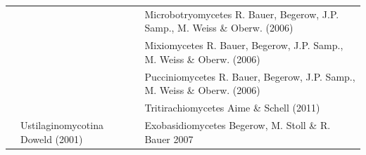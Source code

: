 \documentclass[]{book}
\begin{document}
\begin{longtable}[]{@{}lll@{}}
\begin{minipage}[t]{0.32\columnwidth}
\strut
\end{minipage} & \begin{minipage}[t]{0.28\columnwidth}\raggedright\strut
\strut
\end{minipage} & \begin{minipage}[t]{0.31\columnwidth}\raggedright\strut
Microbotryomycetes R. Bauer, Begerow, J.P. Samp., M. Weiss \& Oberw.
(2006)\strut
\end{minipage}\tabularnewline
\begin{minipage}[t]{0.32\columnwidth}\raggedright\strut
\strut
\end{minipage} & \begin{minipage}[t]{0.28\columnwidth}\raggedright\strut
\strut
\end{minipage} & \begin{minipage}[t]{0.31\columnwidth}\raggedright\strut
Mixiomycetes R. Bauer, Begerow, J.P. Samp., M. Weiss \& Oberw.
(2006)\strut
\end{minipage}\tabularnewline
\begin{minipage}[t]{0.32\columnwidth}\raggedright\strut
\strut
\end{minipage} & \begin{minipage}[t]{0.28\columnwidth}\raggedright\strut
\strut
\end{minipage} & \begin{minipage}[t]{0.31\columnwidth}\raggedright\strut
Pucciniomycetes R. Bauer, Begerow, J.P. Samp., M. Weiss \& Oberw.
(2006)\strut
\end{minipage}\tabularnewline
\begin{minipage}[t]{0.32\columnwidth}\raggedright\strut
\strut
\end{minipage} & \begin{minipage}[t]{0.28\columnwidth}\raggedright\strut
\strut
\end{minipage} & \begin{minipage}[t]{0.31\columnwidth}\raggedright\strut
Tritirachiomycetes Aime \& Schell (2011)\strut
\end{minipage}\tabularnewline
\begin{minipage}[t]{0.32\columnwidth}\raggedright\strut
\strut
\end{minipage} & \begin{minipage}[t]{0.28\columnwidth}\raggedright\strut
Ustilaginomycotina Doweld (2001)\strut
\end{minipage} & \begin{minipage}[t]{0.31\columnwidth}\raggedright\strut
Exobasidiomycetes Begerow, M. Stoll \& R. Bauer 2007\strut

\end{minipage}
\end{longtable}
\end{document}
